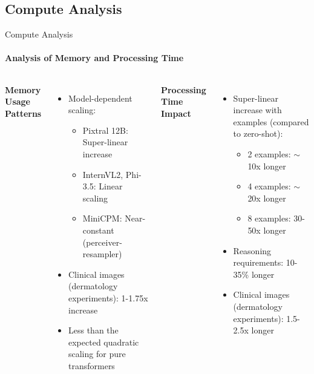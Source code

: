 \documentclass[aspectratio=169]{beamer}
\newcommand\customcolumnwidth{0.4625\textwidth}
\begin{document}
\subsection{Compute Analysis}
\begin{frame}{Compute Analysis}
\framesubtitle{Analysis of Memory and Processing Time}
  \vspace{-1em}
  \begin{columns}[T]
    \column{\customcolumnwidth}
      \textbf{Memory Usage Patterns}
      \begin{itemize}
        \item Model-dependent scaling:
        \begin{itemize}
          \item Pixtral 12B: Super-linear increase
          \item InternVL2, Phi-3.5: Linear scaling
          \item MiniCPM: Near-constant (perceiver-resampler)
        \end{itemize}
        \item Clinical images (dermatology experiments): 1-1.75x increase
        \item Less than the expected quadratic scaling for pure transformers~
      \end{itemize}
    \column{\customcolumnwidth}
      \textbf{Processing Time Impact}
      \begin{itemize}
        \item Super-linear increase with examples (compared to zero-shot):
        \vspace{-1em}
        \begin{itemize}
          \item 2 examples: \(\sim\)10x longer
          \item 4 examples: \(\sim\)20x longer
          \item 8 examples: 30-50x longer
        \end{itemize}
        \item Reasoning requirements: 10-35\% longer
        \item Clinical images (dermatology experiments): 1.5-2.5x longer
      \end{itemize}
  \end{columns}
\end{frame}
\end{document}
